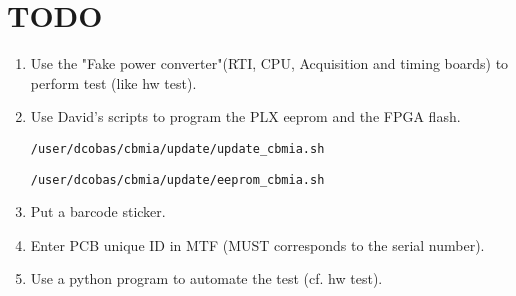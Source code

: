 \documentclass[11pt,a4paper]{article}
\begin{document}
\section{TODO}
\begin{enumerate}
	\item Use the "Fake power converter"(RTI, CPU, Acquisition and timing boards) to perform test (like hw test).
	\item Use David's scripts to program the PLX eeprom and the FPGA flash.
          \begin{verbatim}/user/dcobas/cbmia/update/update_cbmia.sh \end{verbatim}
          \begin{verbatim}/user/dcobas/cbmia/update/eeprom_cbmia.sh \end{verbatim}
        \item Put a barcode sticker.
	\item Enter PCB unique ID in MTF (MUST corresponds to the serial number).
        \item Use a python program to automate the test (cf. hw test).
\end{enumerate}
\end{document}
